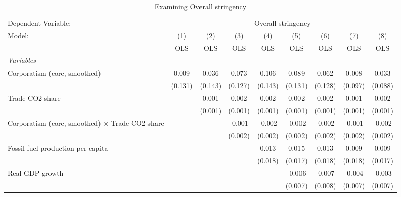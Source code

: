 
\begin{table}[htbp]
   \caption{Examining Overall stringency}
   \centering
   \begin{tabular}{lcccccccc}
      \toprule
      Dependent Variable: & \multicolumn{8}{c}{Overall stringency}\\
      Model:                                                 & (1)     & (2)     & (3)     & (4)     & (5)     & (6)     & (7)     & (8)\\  
                                                             &  OLS    & OLS     & OLS     & OLS     & OLS     & OLS     & OLS     & OLS\\  
      \midrule
      \emph{Variables}\\
      Corporatism (core, smoothed)                           & 0.009   & 0.036   & 0.073   & 0.106   & 0.089   & 0.062   & 0.008   & 0.033\\   
                                                             & (0.131) & (0.143) & (0.127) & (0.143) & (0.131) & (0.128) & (0.097) & (0.088)\\   
      Trade CO2 share                                        &         & 0.001   & 0.002   & 0.002   & 0.002   & 0.002   & 0.001   & 0.002\\   
                                                             &         & (0.001) & (0.001) & (0.001) & (0.001) & (0.001) & (0.001) & (0.001)\\   
      Corporatism (core, smoothed) $\times$ Trade CO2 share  &         &         & -0.001  & -0.002  & -0.002  & -0.002  & -0.001  & -0.002\\   
                                                             &         &         & (0.002) & (0.002) & (0.002) & (0.002) & (0.002) & (0.002)\\   
      Fossil fuel production per capita                      &         &         &         & 0.013   & 0.015   & 0.013   & 0.009   & 0.009\\   
                                                             &         &         &         & (0.018) & (0.017) & (0.018) & (0.018) & (0.017)\\   
      Real GDP growth                                        &         &         &         &         & -0.006  & -0.007  & -0.004  & -0.003\\   
                                                             &         &         &         &         & (0.007) & (0.008) & (0.007) & (0.007)\\   

\end{tabular}
\end{table}
